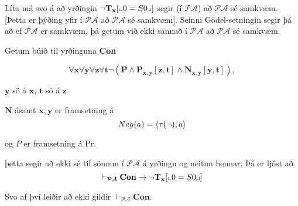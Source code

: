 \documentclass[12pt]{book}
\newcommand{\PA}{\mathcal{PA}}
\newcommand{\bT}{\mathbf{T}}
\newcommand{\bN}{\mathbf{N}}
\newcommand{\bP}{\mathbf{P}}
\newcommand{\bx}{\mathbf{x}}
\newcommand{\by}{\mathbf{y}}
\newcommand{\bz}{\mathbf{z}}
\newcommand{\bt}{\mathbf{t}}
\newcommand{\vP}{\vdash_{\PA}}
\newcommand{\bTx}{\bT_{\bx}}
\DeclarePairedDelimiter{\pg}{\llcorner}{\lrcorner}
\begin{document}
\begin{ath}
  Líta má svo á að yrðingin $\lnot \bTx[\pg{0 = S0}]$ segir (í $\PA$) að $\PA$ sé samkvæm.
  [Þetta er þýðing yfir í $\PA$ að $\PA$ sé samkvæm]. Seinni Gödel-setningin
 segir þá að ef $\PA$ er samkvæm, þá getum við ekki sannað í $\PA$ að
 $\PA$ sé samkvæm.
\end{ath}

Getum búið til yrðinguna \textbf{Con}

\[ \forall \bx \forall \by \forall \bz \forall \bt \lnot (\bP \wedge \bP_{\bx,\by}[\bz,\bt] \wedge \bN_{\bx,\by}[\by,\bt]), \]

$\by$ sö á $\bx$, $\bt$ sö á $\bz$

$\bN$ ásamt $\bx,\by$ er framsetning á  
\[ Neg(a) = \langle\tau(\lnot),a\rangle \]

og $P$ er framsetning á Pr.

þetta segir að ekki sé til sönnun í $\PA$ á yrðingu og neitun hennar. Þá er ljóst að
\[ \vP \mathbf{Con} \to \lnot \bTx[\pg{0 = S0}] \]

Svo af því leiðir að ekki gildir $\vP \mathbf{Con}$.
\end{document}
